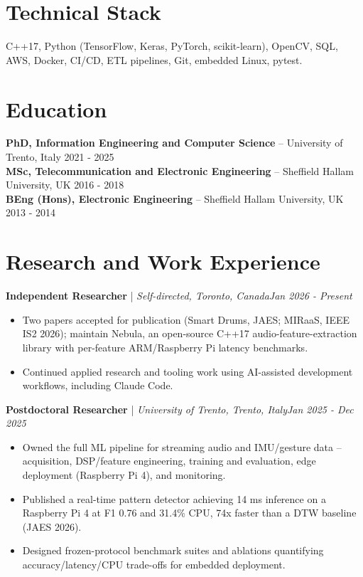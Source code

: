 \documentclass[11pt]{article}
\newenvironment{cvrole}[5]{%
  \par\noindent\textbf{\large #1} | \textit{\small #2, #3}\hfill \textit{\small #4 - #5}\par
  \begin{itemize}[leftmargin=2em, itemsep=-0.3em, topsep=-0.5em]%
}{%
  \end{itemize}\par\noindent\mbox{}\par\vspace{0.1em}%
}
\begin{document}
\section*{Technical Stack}
C++17, Python (TensorFlow, Keras, PyTorch, scikit-learn), OpenCV, SQL, AWS, Docker, CI/CD, ETL pipelines, Git, embedded Linux, pytest.

\section*{Education}
\textbf{PhD, Information Engineering and Computer Science} -- University of Trento, Italy \hfill 2021 - 2025 \\
\textbf{MSc, Telecommunication and Electronic Engineering} -- Sheffield Hallam University, UK \hfill 2016 - 2018 \\
\textbf{BEng (Hons), Electronic Engineering} -- Sheffield Hallam University, UK \hfill 2013 - 2014

\section*{Research and Work Experience}

\begin{cvrole}{Independent Researcher}{Self-directed}{Toronto, Canada}{Jan 2026}{Present}
\item Two papers accepted for publication (Smart Drums, JAES; MIRaaS, IEEE IS2 2026); maintain Nebula, an open-source C++17 audio-feature-extraction library with per-feature ARM/Raspberry Pi latency benchmarks.
\item Continued applied research and tooling work using AI-assisted development workflows, including Claude Code.
\end{cvrole}

\begin{cvrole}{Postdoctoral Researcher}{University of Trento}{Trento, Italy}{Jan 2025}{Dec 2025}
\item Owned the full ML pipeline for streaming audio and IMU/gesture data -- acquisition, DSP/feature engineering, training and evaluation, edge deployment (Raspberry Pi 4), and monitoring.
\item Published a real-time pattern detector achieving 14 ms inference on a Raspberry Pi 4 at F1 0.76 and 31.4\% CPU, 74x faster than a DTW baseline (JAES 2026).
\item Designed frozen-protocol benchmark suites and ablations quantifying accuracy/latency/CPU trade-offs for embedded deployment.
\end{cvrole}
\end{document}
